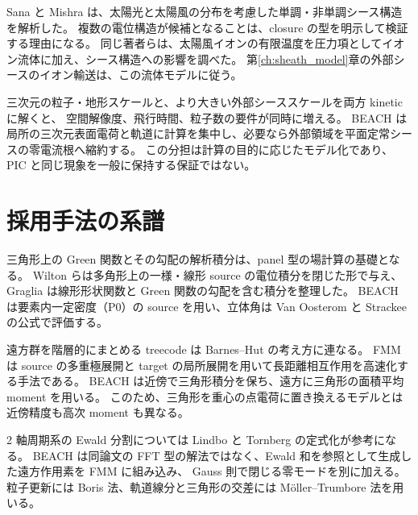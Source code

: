 Sana と Mishra は、太陽光と太陽風の分布を考慮した単調・非単調シース構造を解析した\citep{SanaMishra2023}。
複数の電位構造が候補となることは、closure の型を明示して検証する理由になる。
同じ著者らは、太陽風イオンの有限温度を圧力項としてイオン流体に加え、シース構造への影響を調べた\citep{SanaMishra2026}。
第\ref{ch:sheath_model}章の外部シースのイオン輸送は、この流体モデルに従う。

三次元の粒子・地形スケールと、より大きい外部シーススケールを両方 kinetic に解くと、
空間解像度、飛行時間、粒子数の要件が同時に増える。
BEACH は局所の三次元表面電荷と軌道に計算を集中し、必要なら外部領域を平面定常シースの零電流根へ縮約する。
この分担は計算の目的に応じたモデル化であり、PIC と同じ現象を一般に保持する保証ではない。

\section{採用手法の系譜}
三角形上の Green 関数とその勾配の解析積分は、panel 型の場計算の基礎となる。
Wilton らは多角形上の一様・線形 source の電位積分を閉じた形で与え\citep{Wilton1984}、
Graglia は線形形状関数と Green 関数の勾配を含む積分を整理した\citep{Graglia1993}。
BEACH は要素内一定密度（P0）の source を用い、立体角は Van Oosterom と Strackee の公式で評価する\citep{VanOosterom1983}。

遠方群を階層的にまとめる treecode は Barnes--Hut の考え方に連なる\citep{BarnesHut1986}。
FMM は source の多重極展開と target の局所展開を用いて長距離相互作用を高速化する手法である\citep{GreengardRokhlin1987}。
BEACH は近傍で三角形積分を保ち、遠方に三角形の面積平均 moment を用いる。
このため、三角形を重心の点電荷に置き換えるモデルとは近傍精度も高次 moment も異なる。

2 軸周期系の Ewald 分割については Lindbo と Tornberg の定式化が参考になる\citep{LindboTornberg2012}。
BEACH は同論文の FFT 型の解法ではなく、Ewald 和を参照として生成した遠方作用素を FMM に組み込み、
Gauss 則で閉じる零モードを別に加える。
粒子更新には Boris 法、軌道線分と三角形の交差には Möller--Trumbore 法を用いる\citep{Qin2013,MollerTrumbore1997}。
